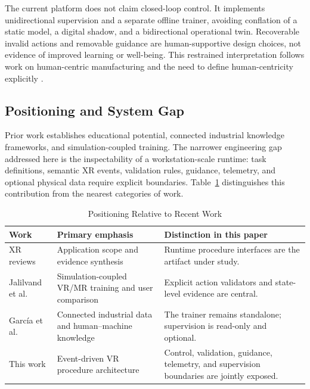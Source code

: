 \documentclass[conference]{IEEEtran}
\begin{document}
The current platform does not claim closed-loop control. It implements unidirectional supervision and a separate offline trainer, avoiding conflation of a static model, a digital shadow, and a bidirectional operational twin. Recoverable invalid actions and removable guidance are human-supportive design choices, not evidence of improved learning or well-being. This restrained interpretation follows work on human-centric manufacturing and the need to define human-centricity explicitly \cite{Longo2020,Lu2022,Wang2022,Li2023,Hermawati2024}.

\subsection{Positioning and System Gap}

Prior work establishes educational potential, connected industrial knowledge frameworks, and simulation-coupled training. The narrower engineering gap addressed here is the inspectability of a workstation-scale runtime: task definitions, semantic XR events, validation rules, guidance, telemetry, and optional physical data require explicit boundaries. Table~\ref{tab:positioning} distinguishes this contribution from the nearest categories of work.

\begin{table}[H]
\caption{Positioning Relative to Recent Work}
\label{tab:positioning}
\centering
\scriptsize
\renewcommand{\arraystretch}{1.12}
\begin{tabular}{@{}p{}p{}p{}@{}}
\toprule
\textbf{Work} & \textbf{Primary emphasis} & \textbf{Distinction in this paper}\\
\midrule
XR reviews \cite{GarciaFracaro2022,WangXR2024} & Application scope and evidence synthesis & Runtime procedure interfaces are the artifact under study.\\
\midrule
Jalilvand et al. \cite{Jalilvand2024} & Simulation-coupled VR/MR training and user comparison & Explicit action validators and state-level evidence are central.\\
\midrule
Garc\'ia et al. \cite{GarciaDTLE2024} & Connected industrial data and human--machine knowledge & The trainer remains standalone; supervision is read-only and optional.\\
\midrule
This work & Event-driven VR procedure architecture & Control, validation, guidance, telemetry, and supervision boundaries are jointly exposed.\\
\bottomrule
\end{tabular}
\end{table}
\end{document}
